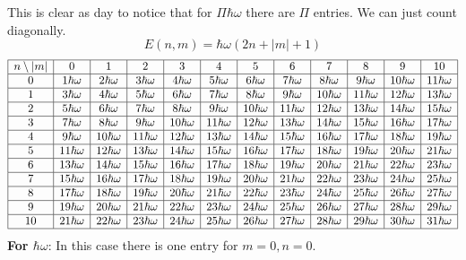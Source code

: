 \documentclass[letter, 10pts]{article}
\newcommand{\hb}{\hbar}
\begin{document}
This is clear as day to notice that for $\Pi \hb \omega$ there are $\Pi$ entries. We can just count diagonally.  
\[
E(n,m) = \hb \omega \left(2 n + |m| + 1\right)
\] 
\[
\begin{array}{|c|c|c|c|c|c|c|c|c|c|c|c|}
\hline
n \setminus |m| & 0 & 1 & 2 & 3 & 4 & 5 & 6 & 7 & 8 & 9 & 10 \\ \hline
0 & 1\hbar\omega & 2\hbar\omega & 3\hbar\omega & 4\hbar\omega & 5\hbar\omega & 6\hbar\omega & 7\hbar\omega & 8\hbar\omega & 9\hbar\omega & 10\hbar\omega & 11\hbar\omega \\ \hline
1 & 3\hbar\omega & 4\hbar\omega & 5\hbar\omega & 6\hbar\omega & 7\hbar\omega & 8\hbar\omega & 9\hbar\omega & 10\hbar\omega & 11\hbar\omega & 12\hbar\omega & 13\hbar\omega \\ \hline
2 & 5\hbar\omega & 6\hbar\omega & 7\hbar\omega & 8\hbar\omega & 9\hbar\omega & 10\hbar\omega & 11\hbar\omega & 12\hbar\omega & 13\hbar\omega & 14\hbar\omega & 15\hbar\omega \\ \hline
3 & 7\hbar\omega & 8\hbar\omega & 9\hbar\omega & 10\hbar\omega & 11\hbar\omega & 12\hbar\omega & 13\hbar\omega & 14\hbar\omega & 15\hbar\omega & 16\hbar\omega & 17\hbar\omega \\ \hline
4 & 9\hbar\omega & 10\hbar\omega & 11\hbar\omega & 12\hbar\omega & 13\hbar\omega & 14\hbar\omega & 15\hbar\omega & 16\hbar\omega & 17\hbar\omega & 18\hbar\omega & 19\hbar\omega \\ \hline
5 & 11\hbar\omega & 12\hbar\omega & 13\hbar\omega & 14\hbar\omega & 15\hbar\omega & 16\hbar\omega & 17\hbar\omega & 18\hbar\omega & 19\hbar\omega & 20\hbar\omega & 21\hbar\omega \\ \hline
6 & 13\hbar\omega & 14\hbar\omega & 15\hbar\omega & 16\hbar\omega & 17\hbar\omega & 18\hbar\omega & 19\hbar\omega & 20\hbar\omega & 21\hbar\omega & 22\hbar\omega & 23\hbar\omega \\ \hline
7 & 15\hbar\omega & 16\hbar\omega & 17\hbar\omega & 18\hbar\omega & 19\hbar\omega & 20\hbar\omega & 21\hbar\omega & 22\hbar\omega & 23\hbar\omega & 24\hbar\omega & 25\hbar\omega \\ \hline
8 & 17\hbar\omega & 18\hbar\omega & 19\hbar\omega & 20\hbar\omega & 21\hbar\omega & 22\hbar\omega & 23\hbar\omega & 24\hbar\omega & 25\hbar\omega & 26\hbar\omega & 27\hbar\omega \\ \hline
9 & 19\hbar\omega & 20\hbar\omega & 21\hbar\omega & 22\hbar\omega & 23\hbar\omega & 24\hbar\omega & 25\hbar\omega & 26\hbar\omega & 27\hbar\omega & 28\hbar\omega & 29\hbar\omega \\ \hline
10 & 21\hbar\omega & 22\hbar\omega & 23\hbar\omega & 24\hbar\omega & 25\hbar\omega & 26\hbar\omega & 27\hbar\omega & 28\hbar\omega & 29\hbar\omega & 30\hbar\omega & 31\hbar\omega \\ \hline
\end{array}
\]
\textbf{For $\hb \omega$}: 
In this case there is one entry for $m = 0, n = 0.$
\end{document}
